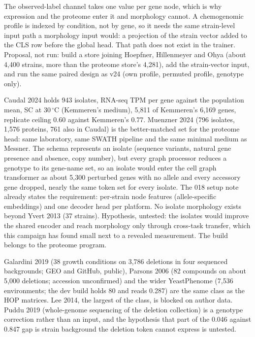 

 The observed-label channel takes one value
per gene node, which is why expression and the proteome enter it and morphology cannot. A
chemogenomic profile is indexed by condition, not by gene, so it needs the same strain-level
input path a morphology input would: a projection of the strain vector added to the CLS
row before the global head. That path does not exist in the trainer. Proposal, not run:
build a store joining Hoepfner, Hillenmeyer and Ohya (about 4{,}400 strains, more than the
proteome store's 4{,}281), add the strain-vector input, and run the same paired design as
v24 (own profile, permuted profile, genotype only).

 Caudal 2024 holds 943 isolates, RNA-seq TPM per
gene against the population mean, SC at 30\,$^\circ$C (Kemmeren's medium), 5{,}811 of
Kemmeren's 6{,}169 genes, replicate ceiling 0.60 against Kemmeren's 0.77. Muenzner 2024
(796 isolates, 1{,}576 proteins, 761 also in Caudal) is the better-matched set for the
proteome head: same laboratory, same SWATH pipeline and the same minimal medium as Messner.
The schema represents an isolate (sequence variants, natural gene presence and absence,
copy number), but every graph processor reduces a genotype to its gene-name set, so an
isolate would enter the cell graph transformer as about 5{,}300 perturbed genes with no
allele and every accessory gene dropped, nearly the same token set for every isolate. The
018 setup note already states the requirement: per-strain node features (allele-specific
embeddings) and one decoder head per platform. No isolate morphology exists beyond Yvert
2013 (37 strains). Hypothesis, untested: the isolates would improve the shared encoder and
reach morphology only through cross-task transfer, which this campaign has found small
next to a revealed measurement. The build belongs to the proteome program.

 Galardini 2019 (38 growth
conditions on 3{,}786 deletions in four sequenced backgrounds; GEO and GitHub, public),
Parsons 2006 (82 compounds on about 5{,}000 deletions; accession unconfirmed) and the wider
YeastPhenome (7{,}536 environments; the dev build holds 80 and reads 0.287) are the same
class as the HOP matrices. Lee 2014, the largest of the class, is blocked on author data.
Puddu 2019 (whole-genome sequencing of the deletion collection) is a genotype correction
rather than an input, and the hypothesis that part of the 0.046 against 0.847 gap is strain
background the deletion token cannot express is untested.

